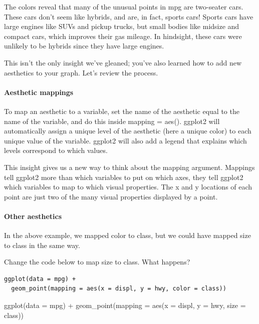\documentclass[
]{article}
\newenvironment{Shaded}{\begin{snugshade}}{\end{snugshade}}
\newcommand{\AttributeTok}[1]{\textcolor[rgb]{0.77,0.63,0.00}{#1}}
\newcommand{\FunctionTok}[1]{\textcolor[rgb]{0.00,0.00,0.00}{#1}}
\newcommand{\NormalTok}[1]{#1}
\newcommand{\SpecialCharTok}[1]{\textcolor[rgb]{0.00,0.00,0.00}{#1}}
\begin{document}
The colors reveal that many of the unusual points in mpg are two-seater
cars. These cars don't seem like hybrids, and are, in fact, sports cars!
Sports cars have large engines like SUVs and pickup trucks, but small
bodies like midsize and compact cars, which improves their gas mileage.
In hindsight, these cars were unlikely to be hybrids since they have
large engines.

This isn't the only insight we've gleaned; you've also learned how to
add new aesthetics to your graph. Let's review the process.

\hypertarget{aesthetic-mappings-1}{%
\paragraph{Aesthetic mappings}\label{aesthetic-mappings-1}}

To map an aesthetic to a variable, set the name of the aesthetic equal
to the name of the variable, and do this inside mapping = aes(). ggplot2
will automatically assign a unique level of the aesthetic (here a unique
color) to each unique value of the variable. ggplot2 will also add a
legend that explains which levels correspond to which values.

This insight gives us a new way to think about the mapping argument.
Mappings tell ggplot2 more than which variables to put on which axes,
they tell ggplot2 which variables to map to which visual properties. The
x and y locations of each point are just two of the many visual
properties displayed by a point.

\hypertarget{other-aesthetics}{%
\paragraph{Other aesthetics}\label{other-aesthetics}}

In the above example, we mapped color to class, but we could have mapped
size to class in the same way.

Change the code below to map size to class. What happens?

\begin{verbatim}
ggplot(data = mpg) + 
  geom_point(mapping = aes(x = displ, y = hwy, color = class))
\end{verbatim}

\begin{Shaded}
\begin{Highlighting}[]
\FunctionTok{ggplot}\NormalTok{(}\AttributeTok{data =}\NormalTok{ mpg) }\SpecialCharTok{+} 
  \FunctionTok{geom\_point}\NormalTok{(}\AttributeTok{mapping =} \FunctionTok{aes}\NormalTok{(}\AttributeTok{x =}\NormalTok{ displ, }\AttributeTok{y =}\NormalTok{ hwy, }\AttributeTok{size =}\NormalTok{ class))}
\end{Highlighting}
\end{Shaded}
\end{document}
